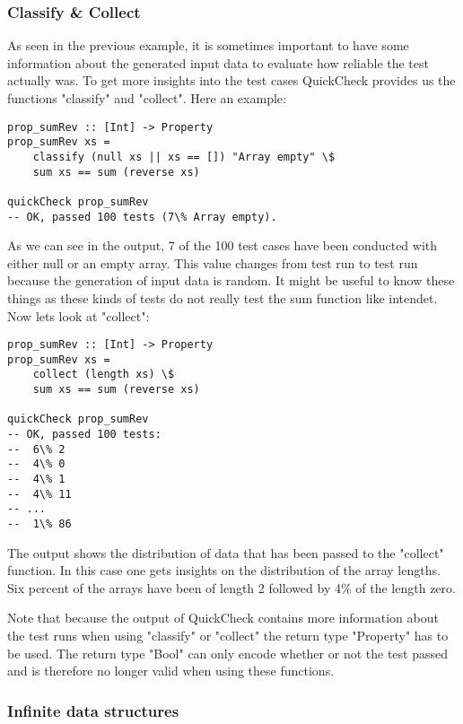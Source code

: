 \documentclass[a4paper, 12pt]{article} %
\begin{document}
\subsubsection{Classify \& Collect}

As seen in the previous example, it is sometimes important to have some information about the generated input data to evaluate how reliable the test actually was. To get more insights into the test cases QuickCheck provides us the functions "classify" and "collect". \cite{Claessen2000} Here an example:

\begin{verbatim}
prop_sumRev :: [Int] -> Property
prop_sumRev xs = 
    classify (null xs || xs == []) "Array empty" \$
    sum xs == sum (reverse xs)

quickCheck prop_sumRev
-- OK, passed 100 tests (7\% Array empty).
\end{verbatim}

As we can see in the output, 7 of the 100 test cases have been conducted with either null or an empty array. This value changes from test run to test run because the generation of input data is random. It might be useful to know these things as these kinds of tests do not really test the sum function like intendet. Now lets look at "collect":

\begin{verbatim}
prop_sumRev :: [Int] -> Property
prop_sumRev xs = 
    collect (length xs) \$
    sum xs == sum (reverse xs)

quickCheck prop_sumRev
-- OK, passed 100 tests:
--  6\% 2 
--  4\% 0 
--  4\% 1 
--  4\% 11 
-- ... 
--  1\% 86 
\end{verbatim}

The output shows the distribution of data that has been passed to the "collect" function. In this case one gets insights on the distribution of the array lengths. Six percent of the arrays have been of length 2 followed by 4\% of the length zero.

Note that because the output of QuickCheck contains more information about the test runs when using "classify" or "collect" the return type "Property" has to be used. The return type "Bool" can only encode whether or not the test passed and is therefore no longer valid when using these functions. 

\subsubsection{Infinite data structures}
\end{document}
